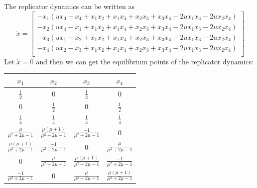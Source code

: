 \documentclass[a4 paper, 12pt]{article}
\begin{document}
 The replicator dynamics can be written as 
\begin{equation}
        \dot{x}=
        \left[
        \begin{array}{c}
         -x_1 (u x_3 - x_4 + x_1 x_2 + x_1 x_4 + x_2 x_3 + x_3 x_4 - 2 u x_1 x_3 - 2 u x_2 x_4)\\
         -x_2 (u x_4 - x_1 + x_1 x_2 + x_1 x_4 + x_2 x_3 + x_3 x_4 - 2 u x_1 x_3 - 2 u x_2 x_4)\\
         -x_3 (u x_1 - x_2 + x_1 x_2 + x_1 x_4 + x_2 x_3 + x_3 x_4 - 2 u x_1 x_3 - 2 u x_2 x_4)\\
         -x_4 (u x_2 - x_3 + x_1 x_2 + x_1 x_4 + x_2 x_3 + x_3 x_4 - 2 u x_1 x_3 - 2 u x_2 x_4)\\
        \end{array}
        \right]
\end{equation}
Let $\dot{x} = 0$ and then we can get the equilibrium points of the replicator dynamics:
\begin{center}
        \begin{tabular}{c c c c} 
        \hline
        $x_1$ & $x_2$ & $x_3$ & $x_4$ \\ 
        \hline
        $\frac{1}{2}$ & 0 & $\frac{1}{2}$ & 0\\ 
        0 & $\frac{1}{2}$ & 0 & $\frac{1}{2}$\\ 
        $\frac{1}{4}$ &  $\frac{1}{4}$ & $\frac{1}{4}$ &  $\frac{1}{4}$\\ 
        $\frac{\mu}{\mu^2 + 2 \mu - 1}$ & $\frac{\mu (\mu + 1)}{\mu^2 + 2 \mu - 1}$ & $\frac{-1}{\mu^2 + 2 \mu - 1}$ & 0\\ 
        $\frac{\mu (\mu + 1)}{\mu^2 + 2 \mu - 1}$  &  $\frac{-1}{\mu^2 + 2 \mu - 1}$ & 0 & $\frac{\mu}{\mu^2 + 2 \mu - 1}$\\ 
        0 & $\frac{\mu}{\mu^2 + 2\mu - 1}$ & $\frac{\mu (\mu + 1)}{\mu^2 + 2 \mu - 1}$ & $\frac{-1}{\mu^2 + 2\mu - 1}$\\ 
        $\frac{-1}{\mu^2 + 2\mu - 1}$ & 0 & $\frac{\mu}{\mu^2 + 2\mu - 1}$ & $\frac{\mu(\mu + 1)}{\mu^2 + 2\mu - 1}$\\ 
        \hline
        \end{tabular}
\end{center}
\end{document}
